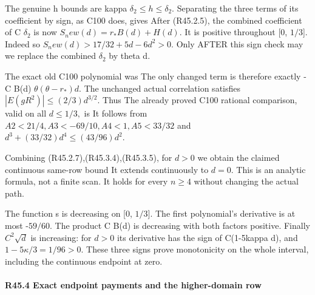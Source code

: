 The genuine h bounds are kappa \(\delta_2\le h\le \delta_2.\) Separating the three terms
of its coefficient by sign, as C100 does, gives
After (R45.2.5), the combined coefficient of C \(\delta_2\) is now
\(S_new(d)=r_*B(d)+H(d).\) It is positive throughout [0, \(1/3\)]. Indeed
so \(S_new(d)>17/32+5d-6d^2>0.\) Only AFTER this sign check may we
replace the combined \(\delta_2\) by theta d.

The exact old C100 polynomial was
The only changed term is therefore exactly
-C B(d) \(\theta(\theta-r_*)d.\) The unchanged actual correlation satisfies
\(|E(gR^2)|\le (2/3)d^{3/2}.\) Thus
The already proved C100 rational comparison, valid on all \(d\le 1/3,\allowbreak \) is
It follows from \(A2<21/4,\allowbreak  A3<-69/10,\allowbreak  A4<1,\allowbreak  A5<33/32\) and
\(d^3+(33/32)d^4\le (43/96)d^2\).

Combining (R45.2.7),(R45.3.4),(R45.3.5), for \(d>0\) we obtain the claimed continuous
same-row bound
It extends continuously to \(d=0.\) This is an analytic formula, not a
finite scan. It holds for every \(n\ge 4\) without changing the actual path.

The function s is decreasing on [0, \(1/3\)]. The first polynomial's derivative
is at most -\(59/60.\) The product C B(d) is decreasing with both factors
positive. Finally \(C^2 \sqrt{d}\) is increasing: for \(d>0\) its derivative has
the sign of C(1-5kappa d), and \(1-5\kappa/3=1/96>0.\) These three signs
prove monotonicity on the whole interval, including the continuous
endpoint at zero.

\paragraph{R45.4 Exact endpoint payments and the higher-domain row}

